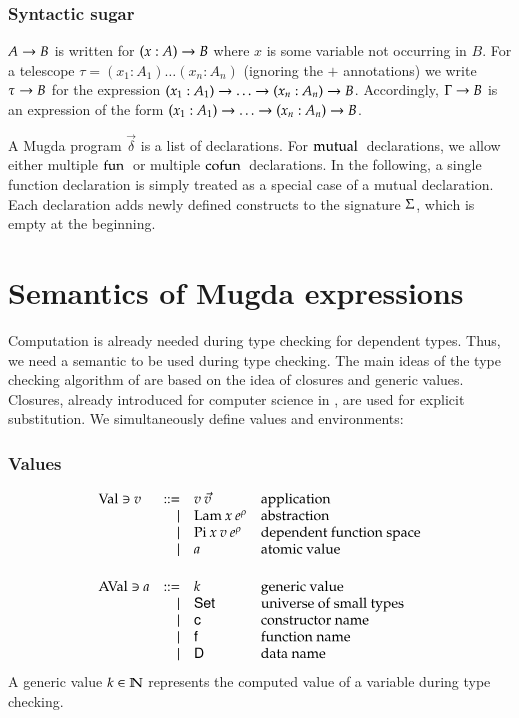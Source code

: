 \subsubsection{Syntactic sugar}
$A \rightarrow B$ is written for $( x : A ) \rightarrow{B}$ where $x$ is some variable not occurring in $B$.
For a telescope $\tau = (x_1 : A_1) \ldots (x_n : A_n)$ (ignoring the $+$ annotations) we write
$\tau \rightarrow B$ for the expression  $( x_1 : A_1 ) \rightarrow{\ldots \rightarrow( x_n : A_n ) \rightarrow{B}}$.
Accordingly, $\Gamma \rightarrow B$ is an expression of the form $( x_1 : A_1 ) \rightarrow{\ldots \rightarrow( x_n : A_n ) \rightarrow{B}}$.

A Mugda program $\vec{\delta}$ is a list of declarations.
For $\mathrm{mutual}\:$ declarations, we allow either multiple $\mathrm{fun}\:$ or multiple $\mathrm{cofun}\:$ declarations.
In the following, a single function declaration is simply treated as a special case of a mutual declaration.
Each declaration adds newly defined constructs to the signature $\mathrm{\Sigma}$, which is empty at the beginning.

\section{Semantics of Mugda expressions}
Computation is already needed during type checking for dependent types.
Thus, we need a semantic to be used during type checking.
The main ideas of the type checking algorithm of \cite{coquand96algorithm} are based on the idea of closures and generic values.
Closures, already introduced for computer science in \cite{Landin63}, are used for explicit substitution.
We simultaneously define values and environments:

\subsubsection{Values}
\[
\begin{array}{lrll}
\Val \ni v & ::= & v \: \vec{v} & \mbox{application}\\
& \mid & \vlam \: x \: \cl{e}{\rho} & \mbox{abstraction}\\
& \mid & \vpi \: x \: v \: \cl{e}{\rho} & \mbox{dependent function space}\\
& \mid & a & \mbox{atomic value}\\
\vs\\
\AVal \ni a & ::= & k & \mbox{generic value}\\
& \mid & \Set & \mbox{universe of small types} \\
& \mid & \cc & \mbox{constructor name}\\
& \mid & \ff & \mbox{function name}\\
& \mid & \DD & \mbox{data name}\\
\end{array}
\]
A generic value $k \in \mathbb{N}$ represents the computed value of a variable during type checking.

